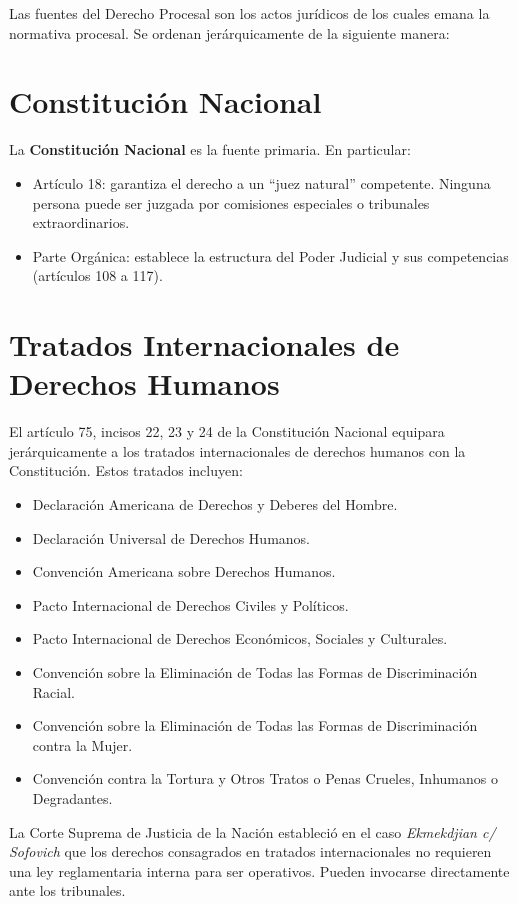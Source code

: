\documentclass[12pt,oneside]{book}
\begin{document}
Las fuentes del Derecho Procesal son los actos jurídicos de los cuales emana la normativa procesal. Se ordenan jerárquicamente de la siguiente manera:

\section{Constitución Nacional}

La \textbf{Constitución Nacional} es la fuente primaria. En particular:

\begin{itemize}
    \item Artículo 18: garantiza el derecho a un ``juez natural'' competente. Ninguna persona puede ser juzgada por comisiones especiales o tribunales extraordinarios.
    \item Parte Orgánica: establece la estructura del Poder Judicial y sus competencias (artículos 108 a 117).
\end{itemize}

\section{Tratados Internacionales de Derechos Humanos}

El artículo 75, incisos 22, 23 y 24 de la Constitución Nacional equipara jerárquicamente a los tratados internacionales de derechos humanos con la Constitución. Estos tratados incluyen:

\begin{itemize}
    \item Declaración Americana de Derechos y Deberes del Hombre.
    \item Declaración Universal de Derechos Humanos.
    \item Convención Americana sobre Derechos Humanos.
    \item Pacto Internacional de Derechos Civiles y Políticos.
    \item Pacto Internacional de Derechos Económicos, Sociales y Culturales.
    \item Convención sobre la Eliminación de Todas las Formas de Discriminación Racial.
    \item Convención sobre la Eliminación de Todas las Formas de Discriminación contra la Mujer.
    \item Convención contra la Tortura y Otros Tratos o Penas Crueles, Inhumanos o Degradantes.
\end{itemize}

\begin{note}
La Corte Suprema de Justicia de la Nación estableció en el caso \textit{Ekmekdjian c/ Sofovich} que los derechos consagrados en tratados internacionales no requieren una ley reglamentaria interna para ser operativos. Pueden invocarse directamente ante los tribunales.
\end{note}
\end{document}
